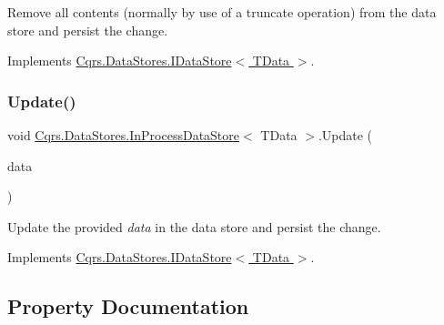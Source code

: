Remove all contents (normally by use of a truncate operation) from the data store and persist the change. 



Implements \hyperlink{interfaceCqrs_1_1DataStores_1_1IDataStore_aead8d7a39a717d29af05daf7b64bea94_aead8d7a39a717d29af05daf7b64bea94}{Cqrs.\+Data\+Stores.\+I\+Data\+Store$<$ T\+Data $>$}.

\mbox{\label{classCqrs_1_1DataStores_1_1InProcessDataStore_af70e6f6e5aabc24ee12ef3d2bcd3bf60_af70e6f6e5aabc24ee12ef3d2bcd3bf60}} 
\subsubsection{\texorpdfstring{Update()}{Update()}}
{\footnotesize\ttfamily void \hyperlink{classCqrs_1_1DataStores_1_1InProcessDataStore}{Cqrs.\+Data\+Stores.\+In\+Process\+Data\+Store}$<$ T\+Data $>$.Update (\begin{DoxyParamCaption}\item[{T\+Data}]{data }\end{DoxyParamCaption})}



Update the provided {\itshape data}  in the data store and persist the change. 



Implements \hyperlink{interfaceCqrs_1_1DataStores_1_1IDataStore_a6d5d4dd572de8db01ff0c48d37faefa7_a6d5d4dd572de8db01ff0c48d37faefa7}{Cqrs.\+Data\+Stores.\+I\+Data\+Store$<$ T\+Data $>$}.



\subsection{Property Documentation}
\mbox{\label{classCqrs_1_1DataStores_1_1InProcessDataStore_aacc8434efa0250be78dda57e159a5aa8_aacc8434efa0250be78dda57e159a5aa8}} 
